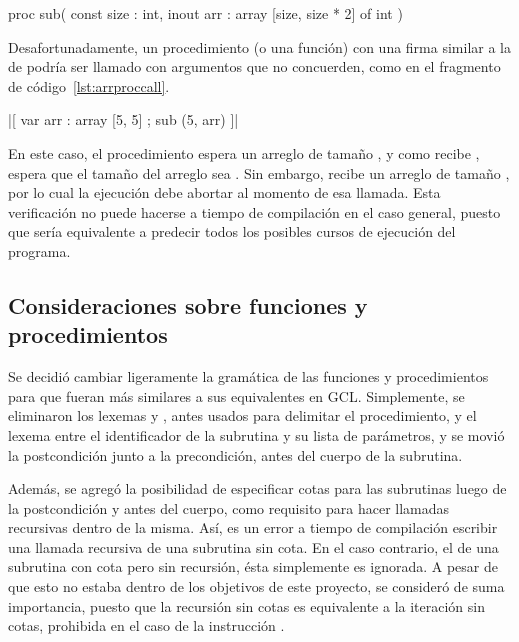 \begin{gracielacode}[caption=Firma de procedimiento con parámetro de tipo arreglo, label=lst:arrproc]
proc sub(
  const size : int,
  inout arr : array [size, size * 2] of int
)
\end{gracielacode}

Desafortunadamente, un procedimiento (o una función) con una firma similar a la
de  podría ser llamado con argumentos que no concuerden, como en el
fragmento de código~\ref{lst:arrproccall}.

\begin{gracielacode}[caption=Llamada a procedimiento con argumento de tipo arreglo, label=lst:arrproccall]
|[ var arr : array [5, 5]
 ; sub (5, arr)
]|
\end{gracielacode}

En este caso, el procedimiento  espera un arreglo de tamaño
, y como recibe , espera que el tamaño
del arreglo sea \ingra{[5, 1~~0]}. Sin embargo, recibe un arreglo de tamaño
\ingra{[5, 5]}, por lo cual la ejecución debe abortar al momento de esa llamada.
Esta verificación no puede hacerse a tiempo de compilación en el caso general,
puesto que sería equivalente a predecir todos los posibles cursos de ejecución
del programa.

\subsection{Consideraciones sobre funciones y procedimientos}

Se decidió cambiar ligeramente la gramática de las funciones y procedimientos
para que fueran más similares a sus equivalentes en GCL. Simplemente, se
eliminaron los lexemas  y , antes usados para
delimitar el procedimiento, y el lexema \ingra{:} entre el identificador de la
subrutina y su lista de parámetros, y se movió la postcondición junto a la
precondición, antes del cuerpo de la subrutina.

Además, se agregó la posibilidad de especificar cotas para las subrutinas luego
de la postcondición y antes del cuerpo, como requisito para hacer llamadas
recursivas dentro de la misma. Así, es un error a tiempo de compilación escribir
una llamada recursiva de una subrutina sin cota. En el caso contrario, el de una
subrutina con cota pero sin recursión, ésta simplemente es ignorada. A pesar de
que esto no estaba dentro de los objetivos de este proyecto, se consideró de
suma importancia, puesto que la recursión sin cotas es equivalente a la
iteración sin cotas, prohibida en el caso de la instrucción .

